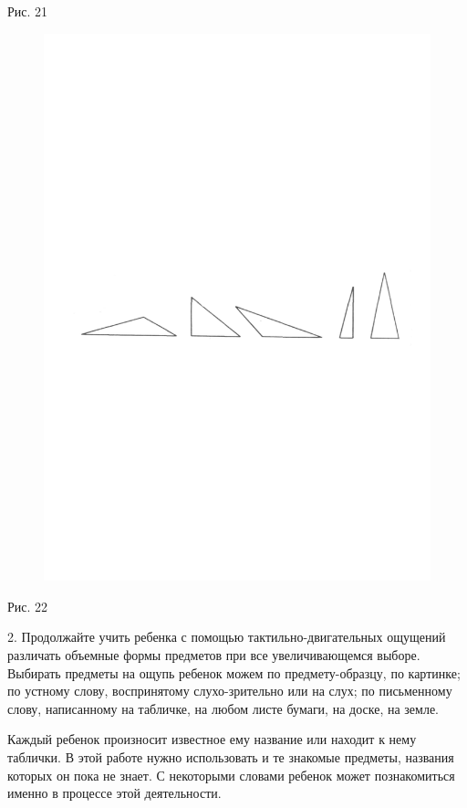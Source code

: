 \documentclass[a5paper]{book}
\begin{document}
Рис. 21

\begin{figure}
\centering
\includegraphics[width=\linewidth]{media/media/image19.png}
\end{figure}

Рис. 22

2. Продолжайте учить ребенка с помощью тактильно-двигательных ощущений
различать объемные формы предметов при все увеличивающемся выборе.
Выбирать предметы на ощупь ребенок можем по предмету-образцу, по
картинке; по устному слову, воспринятому слухо-зрительно или на слух; по
письменному слову, написанному на табличке, на любом листе бумаги, на
доске, на земле.

Каждый ребенок произносит известное ему название или находит к нему
таблички. В этой работе нужно использовать и те знакомые предметы,
названия которых он пока не знает. С некоторыми словами ребенок может
познакомиться именно в процессе этой деятельности.
\end{document}
